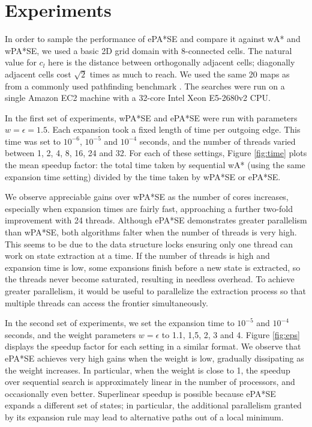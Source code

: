 \documentclass[letterpaper]{article}
\begin{document}
\section{Experiments}

In order to sample the performance of ePA*SE and compare it against wA* and wPA*SE, we used a basic 2D grid domain with 8-connected cells. The natural value for $c_l$ here is the distance between orthogonally adjacent cells; diagonally adjacent cells cost $\sqrt 2$ times as much to reach. We used the same 20 maps as \cite{phillips2014pa} from a commonly used pathfinding benchmark \cite{sturtevant2012benchmarks}. The searches were run on a single Amazon EC2 machine with a 32-core Intel Xeon E5-2680v2 CPU.

In the first set of experiments, wPA*SE and ePA*SE were run with parameters $w=\epsilon=1.5$. Each expansion took a fixed length of time per outgoing edge. This time was set to $10^{-6}$, $10^{-5}$ and $10^{-4}$ seconds, and the number of threads varied between 1, 2, 4, 8, 16, 24 and 32. For each of these settings, Figure \ref{fig:time} plots the mean speedup factor: the total time taken by sequential wA* (using the same expansion time setting) divided by the time taken by wPA*SE or ePA*SE.

We observe appreciable gains over wPA*SE as the number of cores increases, especially when expansion times are fairly fast, approaching a further two-fold improvement with 24 threads. Although ePA*SE demonstrates greater parallelism than wPA*SE, both algorithms falter when the number of threads is very high. This seems to be due to the data structure locks ensuring only one thread can work on state extraction at a time. If the number of threads is high and expansion time is low, some expansions finish before a new state is extracted, so the threads never become saturated, resulting in needless overhead. To achieve greater parallelism, it would be useful to parallelize the extraction process so that multiple threads can access the frontier simultaneously.

In the second set of experiments, we set the expansion time to $10^{-5}$ and $10^{-4}$ seconds, and the weight parameters $w=\epsilon$ to 1.1, 1,5, 2, 3 and 4. Figure \ref{fig:eps} displays the speedup factor for each setting in a similar format. We observe that ePA*SE achieves very high gains when the weight is low, gradually dissipating as the weight increases. In particular, when the weight is close to 1, the speedup over sequential search is approximately linear in the number of processors, and occasionally even better. Superlinear speedup is possible because ePA*SE expands a different set of states; in particular, the additional parallelism granted by its expansion rule may lead to alternative paths out of a local minimum.
\end{document}
